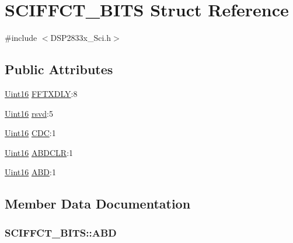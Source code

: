 \hypertarget{struct_s_c_i_f_f_c_t___b_i_t_s}{}\section{S\+C\+I\+F\+F\+C\+T\+\_\+\+B\+I\+T\+S Struct Reference}
\label{struct_s_c_i_f_f_c_t___b_i_t_s}


{\ttfamily \#include $<$D\+S\+P2833x\+\_\+\+Sci.\+h$>$}

\subsection*{Public Attributes}
\begin{DoxyCompactItemize}
\item 
\hyperlink{_d_s_p2833x___device_8h_a59a9f6be4562c327cbfb4f7e8e18f08b}{Uint16} \hyperlink{struct_s_c_i_f_f_c_t___b_i_t_s_adcb0aa7cb2ac44f1aaaf9fd93c18523d}{F\+F\+T\+X\+D\+L\+Y}\+:8
\item 
\hyperlink{_d_s_p2833x___device_8h_a59a9f6be4562c327cbfb4f7e8e18f08b}{Uint16} \hyperlink{struct_s_c_i_f_f_c_t___b_i_t_s_a91647d829e81f817d8e1b4464772483f}{rsvd}\+:5
\item 
\hyperlink{_d_s_p2833x___device_8h_a59a9f6be4562c327cbfb4f7e8e18f08b}{Uint16} \hyperlink{struct_s_c_i_f_f_c_t___b_i_t_s_ae1972f624fbddcf5e1fe8be0b4161ef9}{C\+D\+C}\+:1
\item 
\hyperlink{_d_s_p2833x___device_8h_a59a9f6be4562c327cbfb4f7e8e18f08b}{Uint16} \hyperlink{struct_s_c_i_f_f_c_t___b_i_t_s_a610f4b8b72baf4dc1846fb06dede3b2c}{A\+B\+D\+C\+L\+R}\+:1
\item 
\hyperlink{_d_s_p2833x___device_8h_a59a9f6be4562c327cbfb4f7e8e18f08b}{Uint16} \hyperlink{struct_s_c_i_f_f_c_t___b_i_t_s_a23c1a8b8108f23c2f2a5840cb2d0ea53}{A\+B\+D}\+:1
\end{DoxyCompactItemize}


\subsection{Member Data Documentation}
\hypertarget{struct_s_c_i_f_f_c_t___b_i_t_s_a23c1a8b8108f23c2f2a5840cb2d0ea53}{}
\subsubsection[{A\+B\+D}]{ S\+C\+I\+F\+F\+C\+T\+\_\+\+B\+I\+T\+S\+::\+A\+B\+D}\label{struct_s_c_i_f_f_c_t___b_i_t_s_a23c1a8b8108f23c2f2a5840cb2d0ea53}
\hypertarget{struct_s_c_i_f_f_c_t___b_i_t_s_a610f4b8b72baf4dc1846fb06dede3b2c}{}
